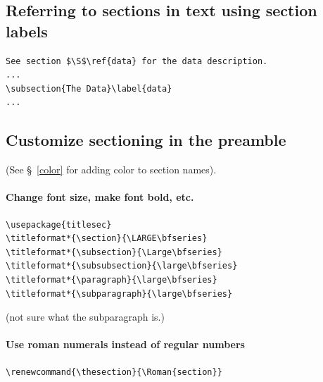 \documentclass{article}
\begin{document}
\subsection{Referring to sections in text using section labels}
\begin{verbatim}
See section $\S$\ref{data} for the data description.
...
\subsection{The Data}\label{data}
...
\end{verbatim}
\subsection{Customize sectioning in the preamble}
(See \S{}~\ref{color} for adding color to section names).
\paragraph{Change font size, make font bold, etc.}
\begin{verbatim}
\usepackage{titlesec}
\titleformat*{\section}{\LARGE\bfseries}
\titleformat*{\subsection}{\Large\bfseries}
\titleformat*{\subsubsection}{\large\bfseries}
\titleformat*{\paragraph}{\large\bfseries}
\titleformat*{\subparagraph}{\large\bfseries}
\end{verbatim}
(not sure what the subparagraph is.)
\paragraph{Use roman numerals instead of regular numbers}
\begin{verbatim}
\renewcommand{\thesection}{\Roman{section}}
\end{verbatim}
\end{document}
